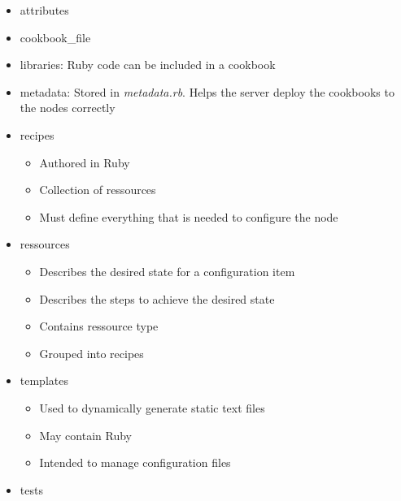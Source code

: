 \begin{itemize}
\begin{itemize}
				\item attributes
				\item cookbook\_file
				\item libraries: Ruby code can be included in a cookbook
				\item metadata: Stored in \textit{metadata.rb}. Helps the server deploy the cookbooks to the nodes correctly
				\item recipes
					\begin{itemize}
						\item Authored in Ruby
						\item Collection of ressources
						\item Must define everything that is needed to configure the node
					\end{itemize}
				\item ressources
					\begin{itemize}
						\item Describes the desired state for a configuration item
						\item Describes the steps to achieve the desired state
						\item Contains ressource type
						\item Grouped into recipes
					\end{itemize}
				\item templates
					\begin{itemize}
						\item Used to dynamically generate static text files
						\item May contain Ruby
						\item Intended to manage configuration files
					\end{itemize}
				\item tests
			\end{itemize}
	\end{itemize}